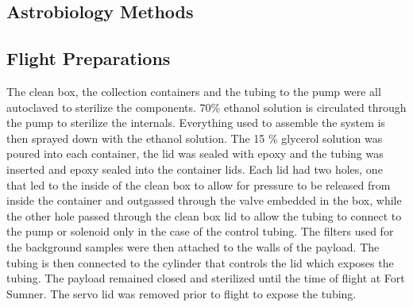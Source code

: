 \subsection{Astrobiology Methods}
\label{sec:Astrobiology Methods}
\subsection{ Flight Preparations }
 The clean box, the collection containers and the tubing to the pump were all autoclaved to sterilize the components. 70\% ethanol solution is circulated through the pump to sterilize the internals. Everything used to assemble the system is then sprayed down with the ethanol solution. The  15 \% glycerol solution was poured into each container, the lid was sealed with epoxy
 and the tubing was inserted and epoxy sealed into the container lids. Each lid had two holes, one that led to the inside of the clean box to allow for pressure to be released from inside the container and outgassed  through the valve embedded in the box, while the other hole passed through the clean box lid to allow the
 tubing to connect to the pump or solenoid only in the case of the control tubing. The filters used for the background samples were then attached to the walls of the payload. The tubing is then connected to the cylinder that controls the lid which exposes the tubing. The payload remained closed and sterilized until the time of flight at Fort Sumner. The servo lid was removed prior to flight to expose the tubing.  